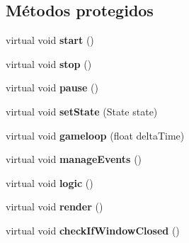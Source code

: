 \subsection*{Métodos protegidos}
\begin{DoxyCompactItemize}
\item 
\hypertarget{class_e_s_e_1_1_scene_a22866cba7abec763ea9ae911a21413b5}{virtual void {\bfseries start} ()}\label{class_e_s_e_1_1_scene_a22866cba7abec763ea9ae911a21413b5}

\item 
\hypertarget{class_e_s_e_1_1_scene_a1c960d5be844bf7b9855a52e9ca387b3}{virtual void {\bfseries stop} ()}\label{class_e_s_e_1_1_scene_a1c960d5be844bf7b9855a52e9ca387b3}

\item 
\hypertarget{class_e_s_e_1_1_scene_a6bd8bc1dc787f5ce8bcdf87680d54882}{virtual void {\bfseries pause} ()}\label{class_e_s_e_1_1_scene_a6bd8bc1dc787f5ce8bcdf87680d54882}

\item 
\hypertarget{class_e_s_e_1_1_scene_a72a3225383964d3e947017fa6cd4fff7}{virtual void {\bfseries set\-State} (State state)}\label{class_e_s_e_1_1_scene_a72a3225383964d3e947017fa6cd4fff7}

\item 
\hypertarget{class_e_s_e_1_1_scene_a83f9a4b9ee1b1a398bec564689fb8aa6}{virtual void {\bfseries gameloop} (float delta\-Time)}\label{class_e_s_e_1_1_scene_a83f9a4b9ee1b1a398bec564689fb8aa6}

\item 
\hypertarget{class_e_s_e_1_1_scene_a4d76f82cec698eb2b75cd3de3510a84c}{virtual void {\bfseries manage\-Events} ()}\label{class_e_s_e_1_1_scene_a4d76f82cec698eb2b75cd3de3510a84c}

\item 
\hypertarget{class_e_s_e_1_1_scene_a45d89e1c2e1b52b056539ddad9941540}{virtual void {\bfseries logic} ()}\label{class_e_s_e_1_1_scene_a45d89e1c2e1b52b056539ddad9941540}

\item 
\hypertarget{class_e_s_e_1_1_scene_ae023ad47de46ea1f5cda35ee3347eb37}{virtual void {\bfseries render} ()}\label{class_e_s_e_1_1_scene_ae023ad47de46ea1f5cda35ee3347eb37}

\item 
\hypertarget{class_e_s_e_1_1_scene_af97af9f21553e082e9bdb65067acd3e8}{virtual void {\bfseries check\-If\-Window\-Closed} ()}\label{class_e_s_e_1_1_scene_af97af9f21553e082e9bdb65067acd3e8}

\end{DoxyCompactItemize}
